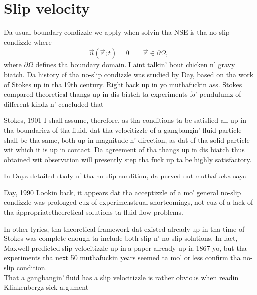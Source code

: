 \section{Slip velocity}
\label{sec:slip_length}
Da usual boundary condizzle we apply when solvin tha NSE is tha no-slip condizzle where
\begin{align}
	\vec u(\vec r; t) = 0 \qquad \vec r \in \partial\Omega,
\end{align}
where $\partial\Omega$ defines tha boundary domain. I aint talkin' bout chicken n' gravy biatch. Da history of tha no-slip condizzle was studied by Day\cite{day1990no}, based on tha work of Stokes up in tha 19th century. Right back up in yo muthafuckin ass. Stokes compared theoretical thangs up in dis biatch ta experiments fo' pendulumz of different kindz n' concluded that
\begin{aquote}{Stokes, 1901}
	I shall assume, therefore, as tha conditions ta be satisfied all up in tha boundariez of tha fluid, dat tha velocitizzle of a gangbangin' fluid particle shall be tha same, both up in magnitude n' direction, as dat of tha solid particle wit which it is up in contact. Da agreement of tha thangs up in dis biatch thus obtained wit observation will presently step tha fuck up ta be highly satisfactory.
\end{aquote}
In Dayz detailed study of tha no-slip condition, da perved-out muthafucka says
\begin{aquote}{Day, 1990}
	Lookin back, it appears dat tha acceptizzle of a mo' general no-slip condizzle was prolonged cuz of experimenstrual shortcomings, not cuz of a lack of tha \'appropriate\' theoretical solutions ta fluid flow problems.
\end{aquote}
In other lyrics, tha theoretical framework dat existed already up in tha time of Stokes was complete enough ta include both slip n' no-slip solutions. In fact, Maxwell predicted slip velocitizzle up in a paper already up in 1867\cite{maxwell1879stresses} yo, but tha experiments tha next 50 muthafuckin years seemed ta mo' or less confirm tha no-slip condition.\\
That a gangbangin' fluid has a slip velocitizzle is rather obvious when readin Klinkenbergz sick argument
